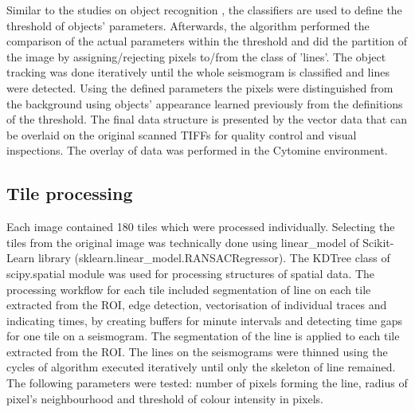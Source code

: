 \documentclass[a4paper,english,12pt]{article}
\begin{document}
Similar to the studies on object recognition \cite{Carmichael,Pernici}, the classifiers are used to define the threshold of objects' parameters. Afterwards, the algorithm performed the comparison of the actual parameters within the threshold and did the partition of the image by assigning/rejecting pixels to/from the class of 'lines'. The object tracking was done iteratively until the whole seismogram is classified and lines were detected. Using the defined parameters the pixels were distinguished from the background using objects' appearance learned previously from the definitions of the threshold. The final data structure is presented by the vector data that can be overlaid on the original scanned TIFFs for quality control and visual inspections. The overlay of data was performed in the Cytomine environment. 

\subsection{Tile processing} 
Each image contained 180 tiles which were processed individually. Selecting the tiles from the original image was technically done using linear\_model of Scikit-Learn library (sklearn.linear\_model.RANSACRegressor). The  KDTree class of scipy.spatial module was used for processing structures of spatial data. The processing workflow for each tile included segmentation of line on each tile extracted from the ROI, edge detection, vectorisation of individual traces and indicating times, by creating buffers for minute intervals and detecting time gaps for one tile on a seismogram. The segmentation of the line is applied to each tile extracted from the ROI. The lines on the seismograms were thinned using the cycles of algorithm executed iteratively until only the skeleton of line remained. The following parameters were tested: number of pixels forming the line, radius of pixel's neighbourhood and threshold of colour intensity in pixels. 
\end{document}
